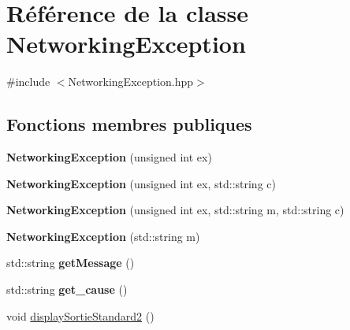\hypertarget{classNetworkingException}{\section{Référence de la classe Networking\-Exception}
\label{classNetworkingException}
}


{\ttfamily \#include $<$Networking\-Exception.\-hpp$>$}

\subsection*{Fonctions membres publiques}
\begin{DoxyCompactItemize}
\item 
\hypertarget{classNetworkingException_a81df7876959eab09308e492dc80c246f}{{\bfseries Networking\-Exception} (unsigned int ex)}\label{classNetworkingException_a81df7876959eab09308e492dc80c246f}

\item 
\hypertarget{classNetworkingException_aa1ce39b8840024c58af2d30cebcb27cc}{{\bfseries Networking\-Exception} (unsigned int ex, std\-::string c)}\label{classNetworkingException_aa1ce39b8840024c58af2d30cebcb27cc}

\item 
\hypertarget{classNetworkingException_aaff78085c8d2c91b3935f8280709bac5}{{\bfseries Networking\-Exception} (unsigned int ex, std\-::string m, std\-::string c)}\label{classNetworkingException_aaff78085c8d2c91b3935f8280709bac5}

\item 
\hypertarget{classNetworkingException_a8d04287652099fa29795b95e674d41dd}{{\bfseries Networking\-Exception} (std\-::string m)}\label{classNetworkingException_a8d04287652099fa29795b95e674d41dd}

\item 
\hypertarget{classNetworkingException_a29d2a57ce7bfd4ab9b8125bd5151f592}{std\-::string {\bfseries get\-Message} ()}\label{classNetworkingException_a29d2a57ce7bfd4ab9b8125bd5151f592}

\item 
\hypertarget{classNetworkingException_a8b4de44e6e8a2456917543bec8b95c68}{std\-::string {\bfseries get\-\_\-cause} ()}\label{classNetworkingException_a8b4de44e6e8a2456917543bec8b95c68}

\item 
void \hyperlink{classNetworkingException_ac5b663a69dff4cce3c5be45a6e245eb4}{display\-Sortie\-Standard2} ()
\end{DoxyCompactItemize}
